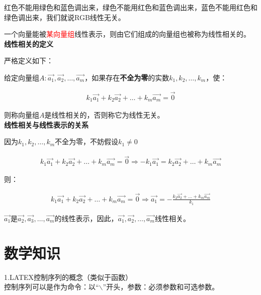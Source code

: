 \documentclass[UTF8]{ctexbook}
\begin{document}
红色不能用绿色和蓝色调出来，绿色不能用红色和蓝色调出来，蓝色不能用红色和绿色调出来，我们就说RGB线性无关。

一个向量能被\textcolor{red}{某向量组}线性表示，则由它们组成的向量组也被称为线性相关的。\\

\textbf{线性相关的定义 }

严格定义如下：

给定向量组$A: \vec{a_{1}},\vec{a_{2}},\dots,\vec{a_{m}}$，如果存在\textbf{不全为零}的实数$k_ {1},k_{2},\dots,k_{m}$，使：

\begin{equation}
\begin{aligned}
k_{1}\vec{a_{1}}+k_{2}\vec{a_{2}}+\dots+k_{m}\vec{a_{m}}=\vec{0}
\end{aligned}
\end{equation}

则称向量组$A$是线性相关的，否则称它为线性无关。\\

\textbf{线性相关与线性表示的关系}

因为$k_ {1},k_{2},\dots,k_{m}$不全为零，不妨假设$k_{1} \neq 0$

\begin{equation}
\begin{aligned}
k_{1}\vec{a_{1}}+k_{2}\vec{a_{2}}+\dots+k_{m}\vec{a_{m}}=\vec{0}
\Rightarrow
-k_{1}\vec{a_{1}}=k_{2}\vec{a_{2}}+\dots+k_{m}\vec{a_{m}}
\end{aligned}
\end{equation}

则：

\begin{equation}
\begin{aligned}
k_{1}\vec{a_{1}}+k_{2}\vec{a_{2}}+\dots+k_{m}\vec{a_{m}}=\vec{0}
\Rightarrow
\vec{a_{1}}=-\frac{k_{2}\vec{a_{2}}+\dots+k_{m}\vec{a_{m}}}{k_{1}}
\end{aligned}
\end{equation}

$\vec{a_{1}}$是$\vec{a_{2}},\vec{a_{3}},\dots,\vec{a_{m}}$的线性表示，因此，$\vec{a_{1}},\vec{a_{2}},\dots,\vec{a_{m}}$线性相关。









\section{数学知识}
    1.LATEX控制序列的概念（类似于函数） \\ 控制序列可以是作为命令：以“$\backslash$”开头，参数：必须参数和可选参数。
\end{document}
